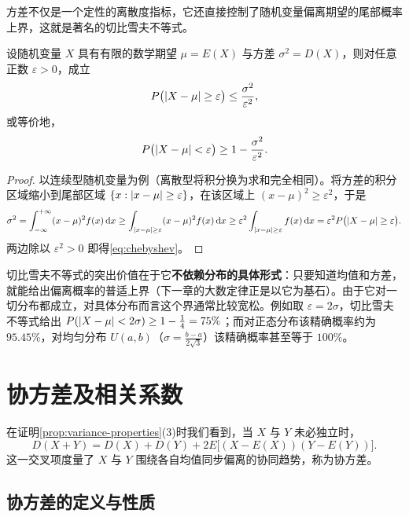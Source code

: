 方差不仅是一个定性的离散度指标，它还直接控制了随机变量偏离期望的尾部概率上界，这就是著名的切比雪夫不等式。

\begin{theorem}[切比雪夫不等式]
\label{thm:chebyshev}
设随机变量 $X$ 具有有限的数学期望 $\mu=E(X)$ 与方差 $\sigma^2=D(X)$，则对任意正数 $\varepsilon>0$，成立
\begin{equation}
  P\bigl(\lvert X-\mu\rvert\ge\varepsilon\bigr)\le\frac{\sigma^2}{\varepsilon^2},
  \label{eq:chebyshev}
\end{equation}
或等价地，
\[
  P\bigl(\lvert X-\mu\rvert<\varepsilon\bigr)\ge 1-\frac{\sigma^2}{\varepsilon^2}.
\]
\end{theorem}
\begin{proof}
以连续型随机变量为例（离散型将积分换为求和完全相同）。将方差的积分区域缩小到尾部区域 $\{x:\lvert x-\mu\rvert\ge\varepsilon\}$，在该区域上 $(x-\mu)^2\ge\varepsilon^2$，于是
\[
  \sigma^2=\int_{-\infty}^{+\infty}(x-\mu)^2 f(x)\mathop{}\!\mathrm{d} x
  \ge\int_{\lvert x-\mu\rvert\ge\varepsilon}(x-\mu)^2 f(x)\mathop{}\!\mathrm{d} x
  \ge\varepsilon^2\int_{\lvert x-\mu\rvert\ge\varepsilon}f(x)\mathop{}\!\mathrm{d} x
  =\varepsilon^2 P\bigl(\lvert X-\mu\rvert\ge\varepsilon\bigr).
\]
两边除以 $\varepsilon^2>0$ 即得\eqref{eq:chebyshev}。
\end{proof}


切比雪夫不等式的突出价值在于它\textbf{不依赖分布的具体形式}：只要知道均值和方差，就能给出偏离概率的普适上界（下一章的大数定律正是以它为基石）。由于它对一切分布都成立，对具体分布而言这个界通常比较宽松。例如取 $\varepsilon=2\sigma$，切比雪夫不等式给出 $P(\lvert X-\mu\rvert<2\sigma)\ge 1-\frac{1}{4}=75\%$；而对正态分布该精确概率约为 $95.45\%$，对均匀分布 $U(a,b)$（$\sigma=\frac{b-a}{2\sqrt{3}}$）该精确概率甚至等于 $100\%$。

\section{协方差及相关系数}
\label{sec:covariance}

在证明\cref{prop:variance-properties}(3)时我们看到，当 $X$ 与 $Y$ 未必独立时，
\[
  D(X+Y)=D(X)+D(Y)+2E\bigl[(X-E(X))(Y-E(Y))\bigr].
\]
这一交叉项度量了 $X$ 与 $Y$ 围绕各自均值同步偏离的协同趋势，称为协方差。

\subsection{协方差的定义与性质}

